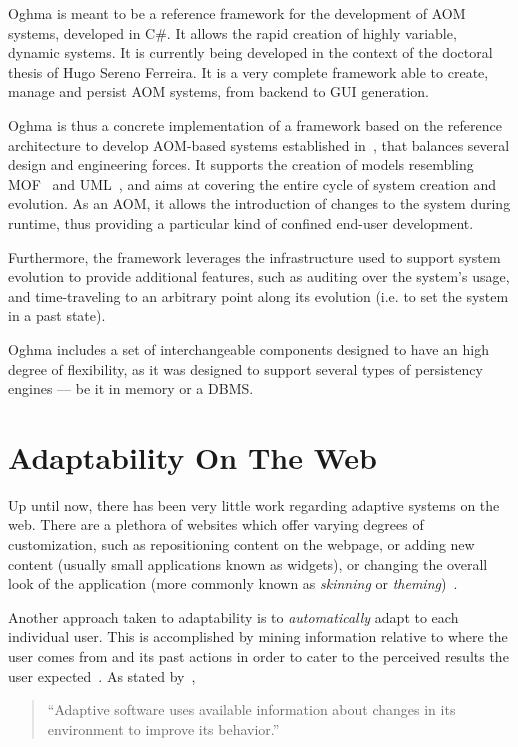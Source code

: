 Oghma is meant to be a reference framework for the development of AOM systems, developed in C\#. It allows the rapid creation of highly variable, dynamic systems. It is currently being developed in the context of the doctoral thesis of Hugo Sereno Ferreira. It is a very complete framework able to create, manage and persist AOM systems, from backend to GUI generation.

Oghma is thus a concrete implementation of a framework based on the reference architecture to develop AOM-based systems established in~\cite{ferreira_phd_2010}, that balances several design and engineering forces. It supports the creation of models resembling MOF~\cite{mof} and UML~\cite{uml}, and aims at covering the entire cycle of system creation and evolution. As an AOM, it allows the introduction of changes to the system during runtime, thus providing a particular kind of confined end-user development.

Furthermore, the framework leverages the infrastructure used to support system evolution to provide additional features, such as auditing over the system’s usage, and time-traveling to an arbitrary point along its evolution (i.e. to set the system in a past state).

Oghma includes a set of interchangeable components designed to have an high degree of flexibility, as it was designed to support several types of persistency engines --- be it in memory or a DBMS.

\section{Adaptability On The Web}\label{sec:web_adaptability}

Up until now, there has been very little work regarding adaptive systems on the web. There are a plethora of websites which offer varying degrees of customization, such as repositioning content on the webpage, or adding new content (usually small applications known as widgets), or changing the overall look of the application (more commonly known as \emph{skinning} or \emph{theming})~\cite{igoogle, pageflakes, protopage, webwag}.

Another approach taken to adaptability is to \emph{automatically} adapt to each individual user. This is accomplished by mining information relative to where the user comes from and its past actions in order to cater to the perceived results the user expected~\cite{GGGR09}. As stated by~\cite{NC}, 

\begin{quote}
  ``Adaptive software uses available information about changes in its environment to improve its behavior.''
\end{quote}

